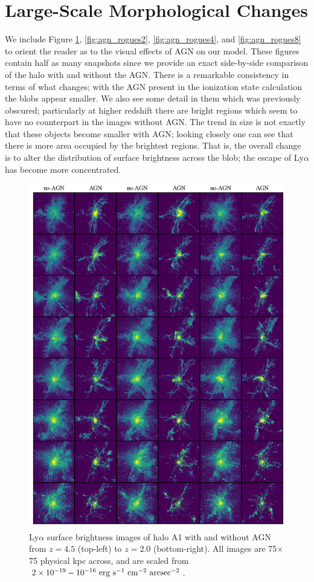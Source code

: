 \section{Large-Scale Morphological Changes}
We include Figure \ref{fig:agn_rogues1}, \ref{fig:agn_rogues2}, \ref{fig:agn_rogues4}, and \ref{fig:agn_rogues8} to orient the reader as to the visual effects of AGN on our model.
These figures contain half as many snapshots since we provide an exact side-by-side comparison of the halo with and without the AGN.
There is a remarkable consistency in terms of what changes; with the AGN present in the ionization state calculation the blobs appear smaller.
We also see some detail in them which was previously obscured; particularly at higher redshift there are bright regions which seem to have no counterpart in the images without AGN.
The trend in size is not exactly that these objects become smaller with AGN; looking closely one can see that there is more area occupied by the brightest regions.
That is, the overall change is to alter the distribution of surface brightness across the blob; the escape of Ly$\alpha$ has become more concentrated.

\begin{figure}
    \centering
    \includegraphics[width=\textwidth,keepaspectratio]{figures/agn_rogues_A1.png}
    \caption{
        Ly$\alpha$ surface brightness images of halo A1 with and without AGN from $z=4.5$ (top-left) to $z=2.0$ (bottom-right).
        All images are 75$\times$75 physical kpc across, and are scaled from $2\times 10^{-19}-10^{-16}\ \rm{erg}\ \rm{s}^{-1}\ \rm{cm}^{-2}\ \rm{arcsec}^{-2}$.
    }
  \label{fig:agn_rogues1}
\end{figure}

